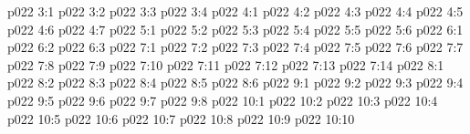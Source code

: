 \vs p022 3:1 
\vs p022 3:2 
\vs p022 3:3 
\vs p022 3:4 
\vs p022 4:1 
\vs p022 4:2 
\vs p022 4:3 
\vs p022 4:4 \pc 
\vs p022 4:5 
\vs p022 4:6 
\vs p022 4:7 
\vs p022 5:1 
\vs p022 5:2 
\vs p022 5:3 
\vs p022 5:4 
\vs p022 5:5 
\vs p022 5:6 
\vs p022 6:1 
\vs p022 6:2 
\vs p022 6:3 
\vs p022 7:1 
\vs p022 7:2 
\vs p022 7:3 
\vs p022 7:4 
\vs p022 7:5 
\vs p022 7:6 
\vs p022 7:7 \pc 
\vs p022 7:8 
\vs p022 7:9 
\vs p022 7:10 \pc 
\vs p022 7:11 \pc 
\vs p022 7:12 
\vs p022 7:13 
\vs p022 7:14 
\vs p022 8:1 
\vs p022 8:2 \pc 
\vs p022 8:3 
\vs p022 8:4 
\vs p022 8:5 
\vs p022 8:6 
\vs p022 9:1 
\vs p022 9:2 
\vs p022 9:3 \pc 
\vs p022 9:4 
\vs p022 9:5 \pc 
\vs p022 9:6 
\vs p022 9:7 
\vs p022 9:8 
\vs p022 10:1 
\vs p022 10:2 \pc 
\vs p022 10:3 
\vs p022 10:4 \pc 
\vs p022 10:5 \pc 
\vs p022 10:6 
\vs p022 10:7 \pc 
\vs p022 10:8 
\vs p022 10:9 \pc 
\vsetoff
\vs p022 10:10 
\quizlink
